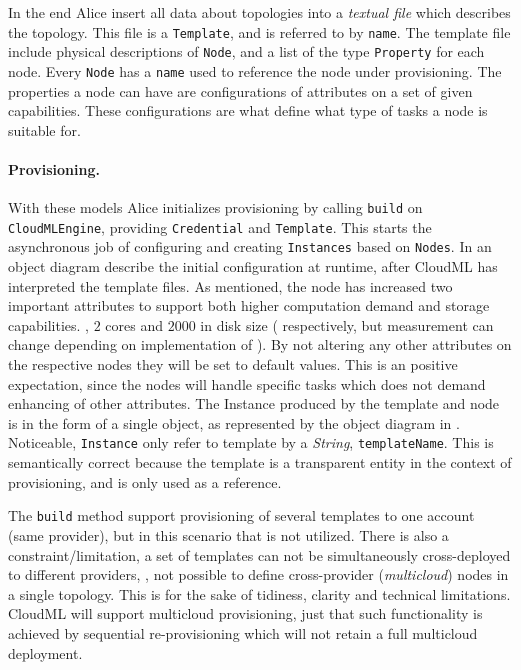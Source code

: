 In the end Alice insert all data about topologies into a \emph{textual file} which describes the topology.
This file is a \texttt{Template}, and is referred to by \texttt{name}.
The template file include physical descriptions of \texttt{Node},
and a list of the type \texttt{Property} for each node.
Every \texttt{Node} has a \texttt{name} used to reference the node under provisioning.
The properties a node can have are configurations of attributes on a set of given capabilities.
These configurations are what define what type of tasks a node is suitable for.

\paragraph{Provisioning.}


With these models Alice initializes provisioning by calling 
\texttt{build} on \texttt{CloudMLEngine}, providing \texttt{Credential} and \texttt{Template}.
This starts the asynchronous job of configuring and creating 
\texttt{Instances} based on \texttt{Nodes}.
In  an object diagram describe the initial configuration at runtime,
after CloudML has interpreted the template files.
As mentioned, the node has increased two important attributes to support both higher computation 
demand and storage capabilities. \ie, $2$ cores and $2000$ in disk size 
( respectively, but measurement can change depending on implementation of ).
By not altering any other attributes on the respective nodes they will be set to default values.
This is an positive expectation, since the nodes will handle specific tasks which does not 
demand enhancing of other attributes.
The Instance produced by the template and node is in the form of a single object,
as represented by the object diagram in .
Noticeable, \texttt{Instance} only refer to template by a \emph{String}, \texttt{templateName}.
This is semantically correct because the template is a transparent entity
in the context of provisioning, and is only used as a reference.

The \texttt{build} method support provisioning of several templates to one account (same provider),
but in this scenario that is not utilized.
There is also a constraint/limitation, a set of templates can not be simultaneously 
cross-deployed to different providers,
\ie, not possible to define cross-provider (\emph{multicloud}) nodes in a single topology.
This is for the sake of tidiness, clarity and technical limitations.
CloudML will support multicloud provisioning,
just that such functionality is achieved by sequential re-provisioning 
which will not retain a full multicloud deployment.

